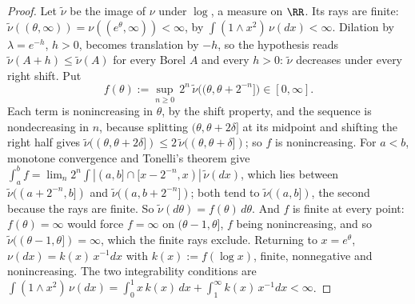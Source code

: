 \begin{proof}
\leanok
Let $\tilde\nu$ be the image of $\nu$ under $\log$, a measure on $\RR$. Its rays are finite:
$\tilde\nu((\theta,\infty)) = \nu((e^\theta,\infty)) < \infty$, by $\int(1 \wedge x^2)\,\nu(dx) <
\infty$. Dilation by $\lambda = e^{-h}$, $h > 0$, becomes translation by $-h$, so the hypothesis
reads $\tilde\nu(A + h) \le \tilde\nu(A)$ for every Borel $A$ and every $h > 0$: $\tilde\nu$
decreases under every right shift. Put
\[
  f(\theta) := \sup_{n \ge 0}\, 2^n\,\tilde\nu\bigl((\theta,\theta + 2^{-n}]\bigr) \in [0,\infty] .
\]
Each term is nonincreasing in $\theta$, by the shift property, and the sequence is nondecreasing in
$n$, because splitting $(\theta,\theta+2\delta]$ at its midpoint and shifting the right half gives
$\tilde\nu((\theta,\theta+2\delta]) \le 2\,\tilde\nu((\theta,\theta+\delta])$; so $f$ is
nonincreasing. For $a < b$, monotone convergence and Tonelli's theorem give
$\int_a^b f = \lim_n 2^n\int|(a,b] \cap [x - 2^{-n}, x)|\,\tilde\nu(dx)$, which lies between
$\tilde\nu((a + 2^{-n}, b])$ and $\tilde\nu((a, b + 2^{-n}])$; both tend to $\tilde\nu((a,b])$, the
second because the rays are finite. So $\tilde\nu(d\theta) = f(\theta)\,d\theta$. And $f$ is finite
at every point: $f(\theta) = \infty$ would force $f = \infty$ on $(\theta - 1, \theta]$, $f$ being
nonincreasing, and so $\tilde\nu((\theta - 1,\theta]) = \infty$, which the finite rays exclude.
Returning to $x = e^\theta$, $\nu(dx) = k(x)\,x^{-1}dx$ with $k(x) := f(\log x)$, finite,
nonnegative and nonincreasing. The two integrability conditions are
$\int(1 \wedge x^2)\,\nu(dx) = \int_0^1 x\,k(x)\,dx + \int_1^\infty k(x)\,x^{-1}dx < \infty$.
\end{proof}

